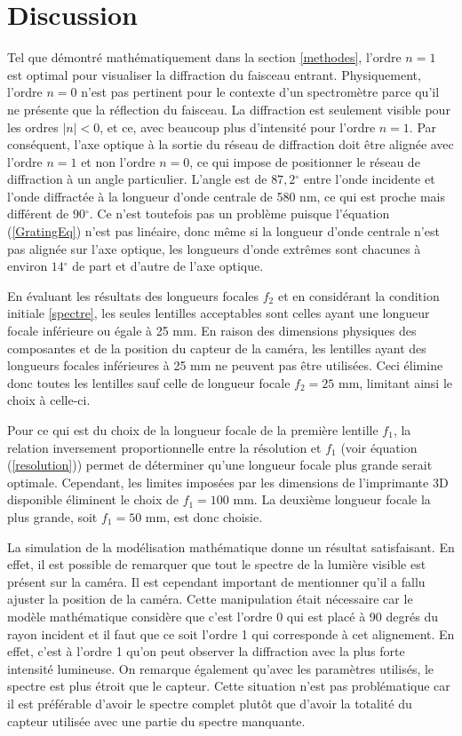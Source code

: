 \documentclass[conference]{IEEEtran}
\begin{document}
\section{Discussion}
Tel que démontré mathématiquement dans la section \ref{methodes}, l'ordre $n=1$ est optimal pour visualiser la diffraction
du faisceau entrant. Physiquement, l'ordre $n=0$ n'est pas pertinent pour le contexte d'un spectromètre parce qu'il ne présente que 
la réflection du faisceau. La diffraction est seulement visible pour les ordres $|n|<0$, et ce, avec beaucoup plus d'intensité pour l'ordre $n=1$.
Par conséquent, l'axe optique à la sortie du réseau de diffraction doit être alignée avec l'ordre $n=1$ et non l'ordre $n=0$, ce qui impose
de positionner le réseau de diffraction à un angle particulier. L'angle est de $87,2{^\circ}$ entre 
l'onde incidente et l'onde diffractée à la longueur d'onde centrale de 580 nm, ce qui est proche mais 
différent de $90{^\circ}$. Ce n'est toutefois pas un problème puisque l'équation (\ref{GratingEq}) 
n'est pas linéaire, donc même si la longueur d'onde centrale n'est pas alignée sur l'axe optique, les
longueurs d'onde extrêmes sont chacunes à environ $14{^\circ}$ de part et d'autre de l'axe optique.

En évaluant les résultats des longueurs focales $f_2$ et en considérant la condition initiale \ref{spectre}, les seules lentilles acceptables sont celles
ayant une longueur focale inférieure ou égale à 25 mm. En raison des dimensions physiques des composantes et de
la position du capteur de la caméra, les lentilles ayant des longueurs focales inférieures à 25 mm ne peuvent pas être utilisées.
Ceci élimine donc toutes les lentilles sauf celle de longueur focale $f_2=25$ mm, limitant ainsi le choix à celle-ci.

Pour ce qui est du choix de la longueur focale de la première lentille $f_1$, la relation inversement proportionnelle
entre la résolution et $f_1$ (voir équation (\ref{resolution})) permet de déterminer qu'une longueur focale plus grande serait optimale. Cependant,
les limites imposées par les dimensions de l'imprimante 3D disponible éliminent le choix de $f_1=100$ mm. La deuxième longueur focale la plus grande, soit $f_1=50$ mm,
est donc choisie.

La simulation de la modélisation mathématique donne un résultat satisfaisant. En effet, il est possible de remarquer que tout le spectre
de la lumière visible est présent sur la caméra. Il est cependant important de mentionner qu'il a fallu ajuster la
position de la caméra. Cette manipulation était nécessaire car le modèle mathématique considère que c'est l'ordre 0 qui est placé à 90 degrés du rayon
incident et il faut que ce soit l'ordre 1 qui corresponde à cet alignement. En effet, c'est à l'ordre 1 qu'on peut observer
la diffraction avec la plus forte intensité lumineuse. On remarque également qu'avec les paramètres utilisés, le spectre est plus étroit
que le capteur. Cette situation n'est pas problématique car il est préférable d'avoir le spectre complet plutôt que d'avoir la totalité du capteur utilisée
avec une partie du spectre manquante.
\end{document}

